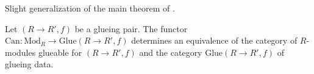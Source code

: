 %
\begin{theorem}
\label{theorem-BL-glueing}
\begin{reference}
Slight generalization of the main theorem of \cite{Beauville-Laszlo}.
\end{reference}
Let $(R \to R',f)$ be a glueing pair. The functor
$\text{Can} : \text{Mod}_R \longrightarrow \text{Glue}(R \to R', f)$
determines an equivalence of the category of $R$-modules glueable
for $(R \to R', f)$ and the category $\text{Glue}(R \to R', f)$
of glueing data.
\end{theorem}


